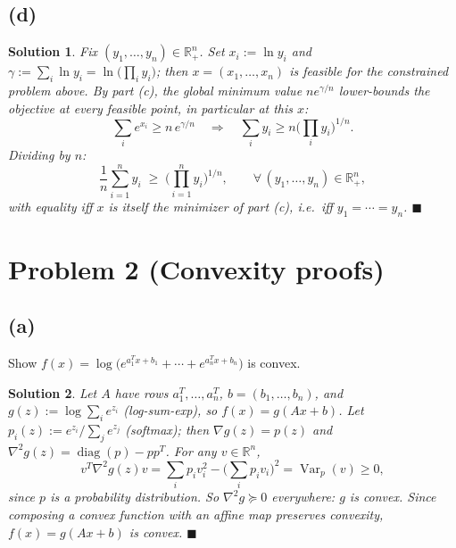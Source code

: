 \documentclass[11pt]{article}
\newcommand{\R}{\mathbb{R}}
\newtheorem*{solution}{Solution}
\begin{document}
\subsection*{(d)}
\begin{solution}
Fix $(y_1,\dots,y_n)\in\R^n_+$. Set $x_i:=\ln y_i$ and $\gamma:=\sum_i\ln y_i=\ln\!\big(\prod_iy_i\big)$; then $x=(x_1,\dots,x_n)$ is feasible for the constrained problem above. By part (c), the global minimum value $ne^{\gamma/n}$ lower-bounds the objective at every feasible point, in particular at this $x$:
\[
\sum_ie^{x_i} \ge n\,e^{\gamma/n} \quad\Longrightarrow\quad \sum_iy_i \ge n\Big(\prod_iy_i\Big)^{1/n}.
\]
Dividing by $n$:
\[
\frac1n\sum_{i=1}^ny_i \;\ge\; \Big(\prod_{i=1}^ny_i\Big)^{1/n}, \qquad\forall\,(y_1,\dots,y_n)\in\R^n_+,
\]
with equality iff $x$ is itself the minimizer of part (c), i.e.\ iff $y_1=\cdots=y_n$. $\blacksquare$
\end{solution}

\section*{Problem 2 (Convexity proofs)}

\subsection*{(a)}
Show $f(x)=\log\big(e^{a_1^Tx+b_1}+\cdots+e^{a_n^Tx+b_n}\big)$ is convex.
\begin{solution}
Let $A$ have rows $a_1^T,\dots,a_n^T$, $b=(b_1,\dots,b_n)$, and $g(z):=\log\sum_ie^{z_i}$ (log-sum-exp), so $f(x)=g(Ax+b)$. Let $p_i(z):=e^{z_i}/\sum_je^{z_j}$ (softmax); then $\nabla g(z)=p(z)$ and $\nabla^2g(z)=\operatorname{diag}(p)-pp^T$. For any $v\in\R^n$,
\[
v^T\nabla^2g(z)v = \sum_ip_iv_i^2-\Big(\sum_ip_iv_i\Big)^2 = \operatorname{Var}_p(v)\ge0,
\]
since $p$ is a probability distribution. So $\nabla^2g\succeq0$ everywhere: $g$ is convex. Since composing a convex function with an affine map preserves convexity, $f(x)=g(Ax+b)$ is convex. $\blacksquare$
\end{solution}
\end{document}
